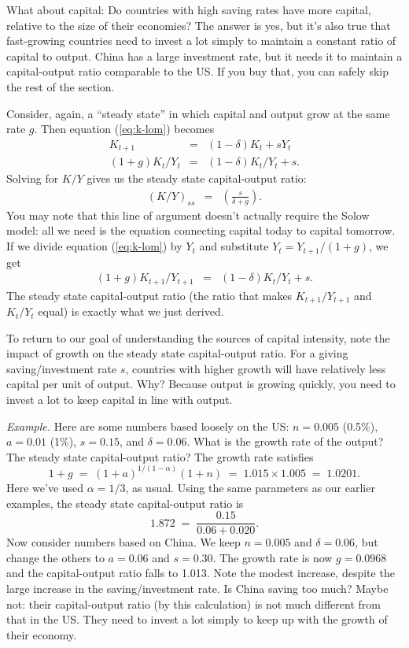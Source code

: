 \documentclass[letterpaper,12pt]{article}
\begin{document}
What about capital:
Do countries with high saving rates have more
capital, relative to the size of their economies?
The answer is yes, but it's also true that 
fast-growing countries need to invest a lot simply to maintain
a constant ratio of capital to output.
China has a large investment rate, but it needs it to maintain a
capital-output ratio comparable to the US.
If you buy that, you can safely skip the rest of the section.

Consider, again, a ``steady state'' in which capital and output grow
at the same rate $g$.
Then equation (\ref{eq:k-lom}) becomes
\begin{eqnarray*}
    K_{t+1}  &=& (1-\delta) K_t + s Y_t  \\
    (1+g) K_t/Y_t &=& (1-\delta) K_t/Y_t + s .
\end{eqnarray*}
Solving for $K/Y$ gives us the steady state capital-output ratio:
\begin{eqnarray}
    (K/Y)_{ss} &=& \left( \frac{s}{\delta+g} \right) .
    \label{eq:ky-ss-g}
\end{eqnarray}
You may note that this line of argument doesn't actually
require the Solow model:
all we need is the equation connecting capital today to capital tomorrow.
If we divide equation (\ref{eq:k-lom})
by $Y_t$ and substitute $ Y_{t} =  Y_{t+1}/(1+g)$, we get
\begin{eqnarray*}
    (1+g) K_{t+1}/Y_{t+1}  &=& (1-\delta) K_t/Y_t + s .
\end{eqnarray*}
The steady state capital-output ratio
(the ratio that makes $K_{t+1}/Y_{t+1}$ and $K_{t}/Y_{t}$ equal)
is exactly what we just derived.


To return to our goal of understanding the sources of capital intensity,
note the impact of growth on the steady state capital-output ratio.
For a giving saving/investment rate $s$, countries with higher growth
will have relatively less capital per unit of output.
Why?  Because output is growing quickly,
you need to invest a lot to keep capital in line with output.


{\it Example.}
Here are some numbers based loosely on the US:
$ n = 0.005 $ (0.5\%), $ a = 0.01 $ (1\%), $s=0.15$,
and $\delta = 0.06$.
What is the growth rate of the output?
The steady state capital-output ratio?
The growth rate satisfies
\[
    1+g \;=\; (1+a)^{1/(1-\alpha)} (1+n) \;=\; 1.015 \times 1.005
        \;=\; 1.0201.
\]
Here we've used $\alpha = 1/3$, as usual.
Using the same parameters as our earlier examples, the steady state
capital-output ratio is
\[
    1.872 \;=\; \frac{0.15}{0.06 + 0.020} .
\]
Now consider numbers based on China.
We keep $ n = 0.005 $ and $\delta = 0.06$,
but change the others to $ a = 0.06 $ and $s = 0.30 $.
The growth rate is now $g = 0.0968$ and the capital-output ratio
falls to 1.013.
Note the modest increase, despite the large increase in the
saving/investment rate.
Is China saving too much?
Maybe not:  their capital-output ratio (by this calculation)
is not much different from that in the US.
They need to invest a lot simply to keep up with the growth
of their economy.
\end{document}
